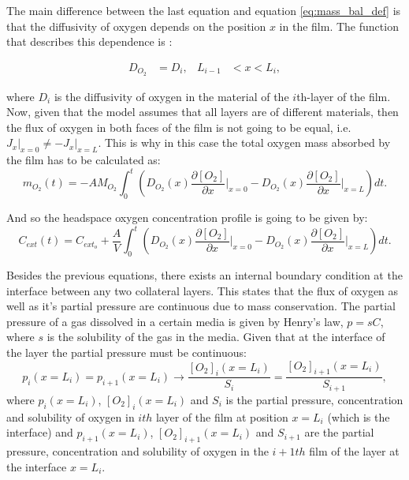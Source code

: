 \begin{refsection}
The main difference between the last equation and equation \ref{eq:mass_bal_def} is that the diffusivity of oxygen depends on the position $x$ in the film. The function that describes this dependence is :

\begin{align}
    D_{O_2}&=  D_i,  & L_{i-1}&< x< L_i,
\end{align}

where $D_i$ is the diffusivity of oxygen in the material of the $i$th-layer of the film. Now, given that the model assumes that all layers are of  different materials, then the flux of oxygen in both faces of the film is not going to be equal, i.e. $J_x\rvert_{x = 0}\neq-J_x\rvert_{x = L} $. This is why in this case the total oxygen mass absorbed by the film has to be calculated as:
\begin{equation}
    m_{O_2}(t) =-AM_{O_2}\int_0^t \left(D_{O_2}(x)\frac{\partial [O_2]}{\partial x}\biggr\rvert_{x = 0} -D_{O_2}(x)\frac{\partial [O_2]}{\partial x}\biggr\rvert_{x = L}\right )dt.
    \label{eq:total_mass_O2_multi}
\end{equation}

And so the headspace oxygen concentration profile is going to be given by:
\begin{equation}
    C_{ext}(t)=C_{ext_o} + \frac{A}{V} \int_0^t \left(D_{O_2}(x)\frac{\partial [O_2]}{\partial x}\biggr\rvert_{x = 0} -D_{O_2}(x)\frac{\partial [O_2]}{\partial x}\biggr\rvert_{x = L}\right) dt.
    \label{eq:headspace_multi}
\end{equation}

Besides the previous equations, there exists an internal boundary condition at the interface between any two collateral layers. This states that the flux of oxygen as well as it's partial pressure are continuous due to mass conservation. The partial pressure of a gas dissolved in a certain media is given by Henry's law, $p=sC$, where $s$ is the solubility of the gas in the media. Given that at the interface of the layer the partial pressure must be continuous:
 \begin{equation}
   p_{i}(x=L_i) =p_{i+1}(x=L_i)  \xrightarrow{}\frac{[O_2]_{i}(x=L_i)}{S_{i}} =\frac{[O_2]_{i+1}(x=L_i)}{S_{i+1}},
 \end{equation} where $p_{i}(x=L_i)$, $[O_2]_{i}(x=L_i)$ and $S_{i}$ is the partial pressure, concentration and solubility of oxygen in $ith$ layer of the film at position $x=L_i$ (which is the interface) and  $p_{i+1}(x=L_i)$, $[O_2]_{i+1}(x=L_i)$ and $S_{i+1}$ are the partial pressure, concentration and solubility of oxygen in the $i+1th$ film of the layer at the interface $x=L_i$. 


\end{refsection}
